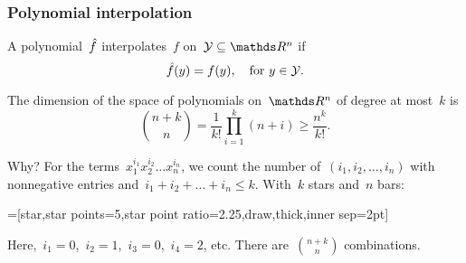 \documentclass{polyu-presentation}
\newcommand{\obj}{f}
\newcommand{\objm}[1][]{\hat{f}\ifthenelse{\equal{#1}{}}{}{^{#1}}}
\newcommand{\xpt}[1][]{\mathcal{Y}\ifthenelse{\equal{#1}{}}{}{^{#1}}}
\begin{document}
\begin{frame}
    \frametitle{Polynomial interpolation}
    
    A polynomial~$\objm$ \alert{interpolates}~$\obj$ on~$\xpt \subseteq \R^n$ if
    \begin{equation*}
        \objm(y) = \obj(y), \quad \text{for~$y \in \xpt$.}
    \end{equation*}

    \begin{block}{}
        The \alert{dimension} of the space of polynomials on~$\R^n$ of degree at most~$k$ is
        \begin{equation*}
            \binom{n + k}{n} = \frac{1}{k!} \prod_{i = 1}^k (n + i) \ge \frac{n^k}{k!}.
        \end{equation*}

        Why?
        For the terms~$x_1^{i_1} x_2^{i_2} \dots x_n^{i_n}$, we \alert{count} the number of~$(i_1, i_2, \dots, i_n)$ with nonnegative entries and~$i_1 + i_2 + \dots + i_n \le k$.
        With~$k$ stars and~$n$ bars:

        \begin{center}
            =[star,star points=5,star point ratio=2.25,draw,thick,inner sep=2pt]
        \end{center}

        Here,~$i_1 = 0$,~$i_2 = 1$,~$i_3 = 0$,~$i_4 = 2$, etc.
        There are~$\binom{n + k}{n}$ \alert{combinations}.
    \end{block}
\end{frame}
\end{document}
